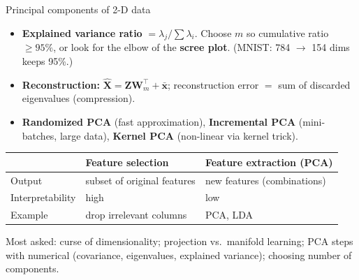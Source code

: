 \begin{drawit}{Principal components of 2-D data}
\centering
{}
\end{drawit}

\begin{itemize}
  \item \textbf{Explained variance ratio} $=\lambda_j/\sum\lambda_i$. Choose $m$ so cumulative ratio $\ge95\%$, or look for the elbow of the \textbf{scree plot}. (MNIST: 784 $\to$ 154 dims keeps 95\%.)
  \item \textbf{Reconstruction:} $\hat{\mathbf X}=\mathbf Z\mathbf W_m^{\!\top}+\bar{\mathbf x}$; reconstruction error $=$ sum of discarded eigenvalues (compression).
  \item \textbf{Randomized PCA} (fast approximation), \textbf{Incremental PCA} (mini-batches, large data), \textbf{Kernel PCA} (non-linear via kernel trick).
\end{itemize}

\begin{center}
\small
\begin{tabular}{@{}p{3cm}p{6.6cm}p{6.6cm}@{}}
\toprule
 & \textbf{Feature selection} & \textbf{Feature extraction (PCA)}\\
\midrule
Output & subset of original features & new features (combinations)\\
Interpretability & high & low\\
Example & drop irrelevant columns & PCA, LDA\\
\bottomrule
\end{tabular}
\end{center}

\begin{imp}
Most asked: curse of dimensionality; projection vs.\ manifold learning; PCA steps with numerical (covariance, eigenvalues, explained variance); choosing number of components.
\end{imp}

